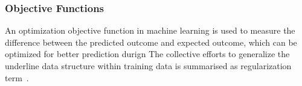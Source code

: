 \subsubsection{Objective Functions}
An optimization objective function in machine learning is used to measure the difference between the predicted outcome and expected outcome, which can be optimized for better prediction durign The collective efforts to generalize the underline data structure within training data is summarised as regularization term~\cite{goodfellow_2015}.  